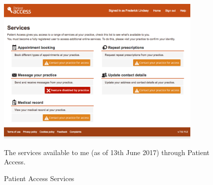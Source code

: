 \begin{figure}[H]
  \centering
  \includegraphics[width = 10cm]{images/patient_access_services.png} \\
  \caption{
  	Patient Access Services
  }{
    The services available to me (as of 13th June 2017) through Patient Access.
  }
  \label{fig:patient_access_services}
\end{figure}
